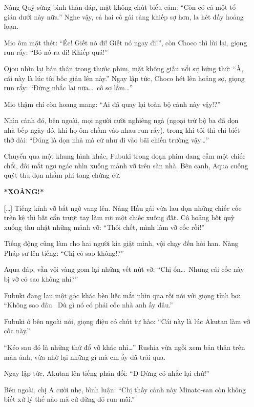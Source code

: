 \documentclass[../main.tex]{subfiles}
\begin{document}
Nàng Quỷ sừng bình thản đáp, mặt không chút biểu cảm: ``Còn có cả một tổ gián dưới này nữa.'' Nghe vậy, cả hai cô gái càng khiếp sợ hơn, la hét đầy hoảng loạn.

Mio ôm mặt thét: ``Éc! Giết nó đi! Giết nó ngay đi!'', còn Choco thì lùi lại, giọng run rẩy: ``Bỏ nó ra đi! Khiếp quá!''

\il

Ojou nhìn lại bản thân trong thước phim, mặt không giấu nổi sự hứng thứ: ``À, cái này là lúc tôi bốc gián lên này.'' Ngay lập tức, Choco hét lên hoảng sợ, giọng run rẩy: ``Đừng nhắc lại nữa\dots\ cô sợ lắm\dots''

Mio thậm chí còn hoang mang: ``Ai đã quay lại toàn bộ cảnh này vậy!?''

Nhìn cảnh đó, bên ngoài, mọi người cười nghiêng ngả (ngoại trừ bộ ba đã dọn nhà bếp ngày đó, khi họ ôm chầm vào nhau run rẩy), trong khi tôi thì chỉ biết thở dài: ``Đúng là dọn nhà mà cứ như đi vào bãi chiến trường vậy\dots''

Chuyển qua một khung hình khác, Fubuki trong đoạn phim đang cầm một chiếc chổi, đôi mắt ngơ ngác nhìn xuống mảnh vỡ trên sàn nhà. Bên cạnh, Aqua cuống quýt thu dọn nhằm phi tang chứng cứ.

\il

\textbf{*XOẢNG!*}

[\dots] Tiếng kính vỡ bất ngờ vang lên. Nàng Hầu gái vừa lau dọn những chiếc cốc trên kệ thì bất cẩn trượt tay làm rơi một chiếc xuống đất. Cô hoảng hốt quỳ xuống thu nhặt những mảnh vỡ: ``Thôi chết, mình làm vỡ cốc rồi!''

Tiếng động cũng làm cho hai người kia giật mình, vội chạy đến hỏi han. Nàng Pháp sư lên tiếng: ``Chị có sao không!?''

Aqua đáp, vẫn vội vàng gom lại những vết nứt vỡ: ``Chị ổn\dots\ Nhưng cái cốc này bị vỡ có sao không nhỉ?''

Fubuki đang lau một góc khác bèn liếc mắt nhìn qua rồi nói với giọng tỉnh bơ: ``Không sao đâu~ Dù gì nó có phải cốc nhà anh ấy đâu.''

\il

Fubuki ở bên ngoài nói, giọng điệu có chút tự hào: ``Cái này là lúc Akutan làm vỡ cốc này.''

``Kéo sau đó là những thứ đổ vỡ khác nhỉ\dots'' Rushia vừa ngồi xem bản thân trên màn ảnh, vừa nhớ lại những gì mà em ấy đã trải qua.

Ngay lập tức, Akutan lên tiếng phản đối: ``Đ-Đừng có nhắc lại chứ!''

Bên ngoài, chị A cười nhẹ, bình luận: ``Chị thấy cảnh này Minato-san còn không biết xử lý thế nào mà cứ đứng đó run mãi.''
\end{document}
